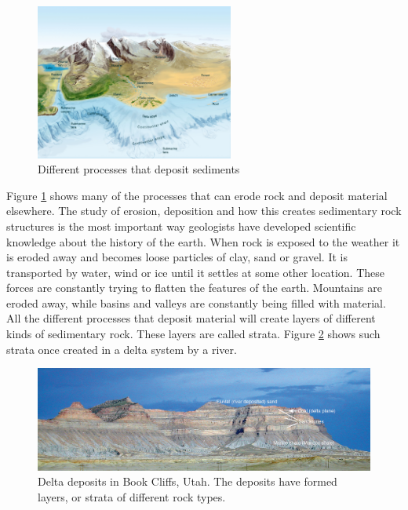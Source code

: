 \documentclass[a4paper,12pt]{report}
\begin{document}
\begin{figure}
  \begin{center}
    \includegraphics[width=0.58\textwidth]{thesis/geo/english/geoDeposits.jpg}
  \end{center}
  \caption{Different processes that deposit sediments}
  \label{fig:geoDeposit}
\end{figure}


Figure \ref{fig:geoDeposit} shows many of the processes that can erode rock and deposit material elsewhere. The study of erosion, deposition and how this creates sedimentary rock structures is the most important way geologists have developed scientific knowledge about the history of the earth. When rock is exposed to the weather it is eroded away and becomes loose particles of clay, sand or gravel. It is transported by water, wind or ice until it settles at some other location. These forces are constantly trying to flatten the features of the earth. Mountains are eroded away, while basins and valleys are constantly being filled with material. All the different processes that deposit material will create layers of different kinds of sedimentary rock. These layers are called strata. Figure \ref{fig:strata} shows such strata once created in a delta system by a river.


\begin{figure}
 \includegraphics[width=\linewidth]{thesis/geo/english/strata.jpg}
 \caption{Delta deposits in Book Cliffs, Utah. The deposits have formed layers, or strata of different rock types.}
 \label{fig:strata}
\end{figure}
\end{document}

